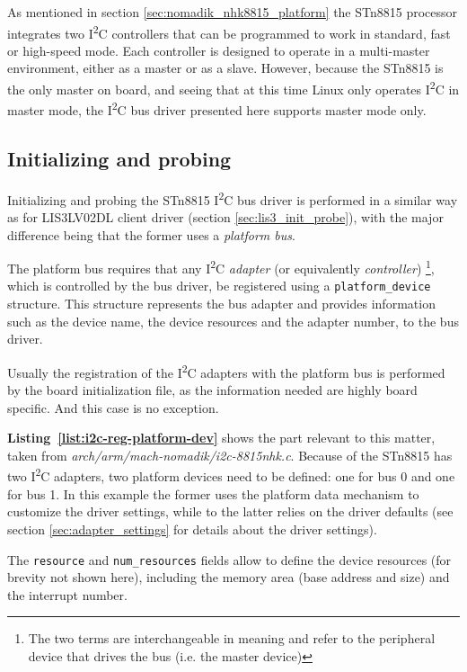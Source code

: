 \documentclass[a4paper,10pt]{article}
\newcommand{\iic}{I\textsuperscript{2}C }
\newcommand{\keyword}[1]{\texttt{#1}}
\newcommand{\refl}[1]{\textbf{Listing~\ref{#1}}}
\begin{document}
\begin{multicols}{2}
As mentioned in section \ref{sec:nomadik_nhk8815_platform} the STn8815 processor
integrates two \iic controllers that can be programmed to work in standard, fast
or high-speed mode. Each controller is designed to operate in a multi-master environment,
either as a master or as a slave. However, because the STn8815 is the only master
on board, and seeing that at this time Linux only operates \iic in master mode, 
the \iic bus driver presented here supports master mode only.


\subsection{Initializing and probing}
\label{sec:adapter_init_probe}
Initializing and probing the STn8815 \iic bus driver is performed in a similar
way as for LIS3LV02DL client driver (section \ref{sec:lis3_init_probe}), with
the major difference being that the former uses a \emph{platform bus}.

The platform bus requires that any \iic \emph{adapter} (or equivalently
\emph{controller})
\footnote{The two terms are interchangeable in meaning and refer to the
peripheral device that drives the bus (i.e. the master device)}, which is
controlled by the bus driver, be registered using a \keyword{platform\_device}
structure.
This structure represents the bus adapter and provides information such as the
device name, the device resources and the adapter number, to the bus driver.

Usually the registration of the \iic adapters with the platform bus is
performed by the board initialization file, as the information needed are
highly board specific. And this case is no exception.

\refl{list:i2c-reg-platform-dev} shows the part relevant to this
matter, taken from \emph{arch/arm/mach-nomadik/i2c-8815nhk.c}. Because of the
STn8815 has two \iic adapters, two platform devices need to be defined: one for
bus 0 and one for bus 1.
In this example the former uses the platform data mechanism to customize the
driver settings, while to the latter relies on the driver defaults
(see section \ref{sec:adapter_settings} for details about the driver settings).

The \keyword{resource} and \keyword{num\_resources} fields allow to define
the device resources (for brevity not shown here), including the memory area
(base address and size) and the interrupt number.


\end{multicols}
\end{document}
